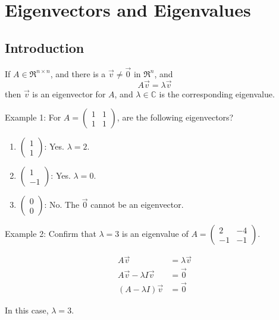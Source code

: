 \section{Eigenvectors and Eigenvalues}
\subsection{Introduction}
\begin{definition}
    If \(A \in \Re^{n\times n}\), and there is a \(\Vec{v} \ne \Vec{0}\) in \(\Re^n\), and
    \[A\Vec{v} = \lambda \Vec{v}\]
    then \(\Vec{v}\) is an eigenvector for \(A\), and \(\lambda \in \mathbb{C}\) is the corresponding eigenvalue.
\end{definition}

\noindent
Example 1: For \(A = \begin{pmatrix}
    1 & 1 \\ 1 & 1
\end{pmatrix}\), are the following eigenvectors?
\begin{enumerate}
    \item \(\begin{pmatrix}
        1 \\ 1 
    \end{pmatrix}\): Yes. \(\lambda=2\).
    \item \(\begin{pmatrix}
        1 \\ -1
    \end{pmatrix}\): Yes. \(\lambda=0\).
    \item \(\begin{pmatrix}
        0 \\0 
    \end{pmatrix}\): No. The \(\Vec{0}\) cannot be an eigenvector.
\end{enumerate}

\noindent
Example 2: Confirm that \(\lambda=3\) is an eigenvalue of \(A = \begin{pmatrix}
    2 & -4 \\ -1 & -1
\end{pmatrix}\).

\begin{align}
    A\Vec{v} &= \lambda \Vec{v} \\
    A\Vec{v} - \lambda I \Vec{v} &= \Vec{0} \\
    (A-\lambda I) \Vec{v} &= \Vec{0}
\end{align}

\noindent
In this case, \(\lambda = 3\).

